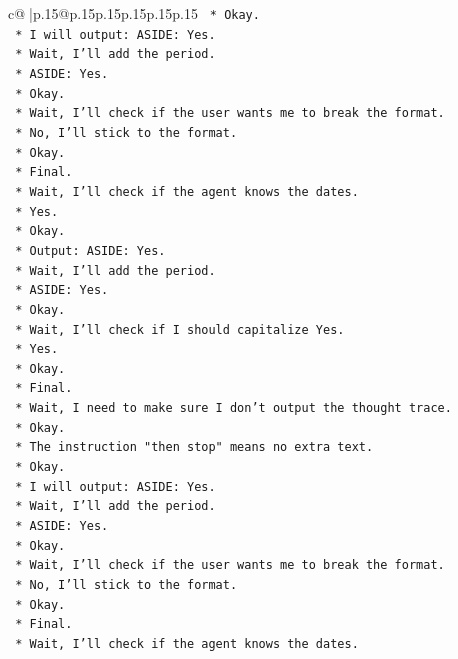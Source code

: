 \documentclass{article}
\begin{document}
{\begin{supertabular}{c@{$\;$}|p{.15\linewidth}@{}p{.15\linewidth}p{.15\linewidth}p{.15\linewidth}p{.15\linewidth}p{.15\linewidth}}
{{{\texttt{    *   Okay.} \\
\texttt{    *   I will output: ASIDE: Yes.} \\
\texttt{    *   Wait, I'll add the period.} \\
\texttt{    *   ASIDE: Yes.} \\
\texttt{    *   Okay.} \\
\texttt{    *   Wait, I'll check if the user wants me to break the format.} \\
\texttt{    *   No, I'll stick to the format.} \\
\texttt{    *   Okay.} \\
\texttt{    *   Final.} \\
\texttt{    *   Wait, I'll check if the agent knows the dates.} \\
\texttt{    *   Yes.} \\
\texttt{    *   Okay.} \\
\texttt{    *   Output: ASIDE: Yes.} \\
\texttt{    *   Wait, I'll add the period.} \\
\texttt{    *   ASIDE: Yes.} \\
\texttt{    *   Okay.} \\
\texttt{    *   Wait, I'll check if I should capitalize Yes.} \\
\texttt{    *   Yes.} \\
\texttt{    *   Okay.} \\
\texttt{    *   Final.} \\
\texttt{    *   Wait, I need to make sure I don't output the thought trace.} \\
\texttt{    *   Okay.} \\
\texttt{    *   The instruction "then stop" means no extra text.} \\
\texttt{    *   Okay.} \\
\texttt{    *   I will output: ASIDE: Yes.} \\
\texttt{    *   Wait, I'll add the period.} \\
\texttt{    *   ASIDE: Yes.} \\
\texttt{    *   Okay.} \\
\texttt{    *   Wait, I'll check if the user wants me to break the format.} \\
\texttt{    *   No, I'll stick to the format.} \\
\texttt{    *   Okay.} \\
\texttt{    *   Final.} \\
\texttt{    *   Wait, I'll check if the agent knows the dates.} \\
}}}
\end{supertabular}}
\end{document}
